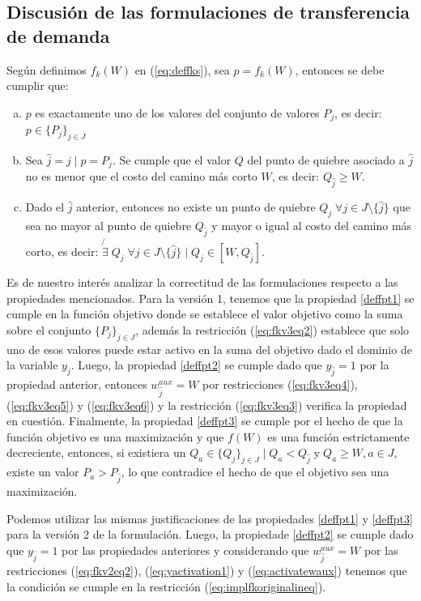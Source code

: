 \subsection{Discusión de las formulaciones de transferencia de demanda}

Según definimos $f_k(W)$ en (\ref{eq:deffks}), sea $p = f_k(W)$, entonces se debe cumplir que:

\begin{enumerate}[(a)]
  \item {\label{deffpt1} $p$ es exactamente uno de los valores del conjunto de valores $P_j$, es decir: $p \in \{P_j\}_{j \in J}$}
  \item {\label{deffpt2} Sea $\hat{j} = j \;|\; p = P_j$. Se cumple que el valor $Q$ del punto de quiebre asociado a $\hat{j}$ no es menor que el costo del camino más corto $W$, es decir: $Q_{\hat{j}} \geq W$.}
  \item {\label{deffpt3} Dado el $\hat{j}$ anterior, entonces no existe un punto de quiebre $Q_j \; \forall j \in J\setminus\{\hat{j}\}$ que sea no mayor al punto de quiebre $Q_{\hat{j}}$ y mayor o igual al costo del camino más corto, es decir: $\not{\exists}\; Q_j\; \forall j \in J\setminus\{\hat{j}\} \;|\; Q_j \in  [W, Q_{\hat{j}}]$}.
\end{enumerate}

Es de nuestro interés analizar la correctitud de las formulaciones respecto a las propiedades mencionados. Para la versión 1, tenemos que la propiedad \ref{deffpt1} se cumple en la función objetivo donde se establece el valor objetivo como la suma sobre el conjunto $\{P_j\}_{j \in J}$, además la restricción (\ref{eq:fkv3eq2}) establece que solo uno de esos valores puede estar activo en la suma del objetivo dado el dominio de la variable $y_j$. Luego, la propiedad \ref{deffpt2} se cumple dado que $y_{\hat{j}} = 1$ por la propiedad anterior, entonces $w_{\hat{j}}^{aux} = W$ por restricciones (\ref{eq:fkv3eq4}), (\ref{eq:fkv3eq5}) y (\ref{eq:fkv3eq6}) y la restricción (\ref{eq:fkv3eq3}) verifica la propiedad en cuestión. Finalmente, la propiedad \ref{deffpt3} se cumple por el hecho de que la función objetivo es una maximización y que $f(W)$ es una función estrictamente decreciente, entonces, si existiera un $Q_a \in \{Q_j\}_{j \in J} \;|\; Q_a < Q_{\hat{j}} \;\text{y}\; Q_a \geq W, a \in J$, existe un valor $P_a > P_{\hat{j}}$, lo que contradice el hecho de que el objetivo sea una maximización.

Podemos utilizar las mismas justificaciones de las propiedades \ref{deffpt1} y \ref{deffpt3} para la versión 2 de la formulación. Luego, la propiedade \ref{deffpt2} se cumple dado que $y_{\hat{j}} = 1$ por las propiedades anteriores y considerando que $w^{aux}_{\hat{j}} = W$ por las restricciones (\ref{eq:fkv2eq2}), (\ref{eq:yactivation1}) y (\ref{eq:activatewaux}) tenemos que la condición se cumple en la restricción (\ref{eq:implfkoriginalineq}).


